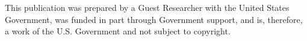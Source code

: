 This publication was prepared by a Guest Researcher with the United States Government, was funded in part through Government support, and is, therefore, a work of the U.S. Government and not subject to copyright.